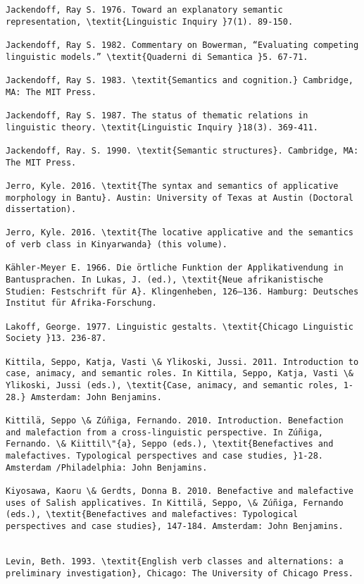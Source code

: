 \documentclass[output=paper]{langsci/langscibook}
\begin{document}
\begin{verbatim}
Jackendoff, Ray S. 1976. Toward an explanatory semantic representation, \textit{Linguistic Inquiry }7(1). 89-150.

Jackendoff, Ray S. 1982. Commentary on Bowerman, “Evaluating competing linguistic models.” \textit{Quaderni di Semantica }5. 67-71.

Jackendoff, Ray S. 1983. \textit{Semantics and cognition.} Cambridge, MA: The MIT Press.

Jackendoff, Ray S. 1987. The status of thematic relations in linguistic theory. \textit{Linguistic Inquiry }18(3). 369-411.

Jackendoff, Ray. S. 1990. \textit{Semantic structures}. Cambridge, MA: The MIT Press.

Jerro, Kyle. 2016. \textit{The syntax and semantics of applicative morphology in Bantu}. Austin: University of Texas at Austin (Doctoral dissertation). 

Jerro, Kyle. 2016. \textit{The locative applicative and the semantics of verb class in Kinyarwanda} (this volume).

Kähler-Meyer E. 1966. Die örtliche Funktion der Applikativendung in Bantusprachen. In Lukas, J. (ed.), \textit{Neue afrikanistische Studien: Festschrift für A}. Klingenheben, 126–136. Hamburg: Deutsches Institut für Afrika-Forschung.

Lakoff, George. 1977. Linguistic gestalts. \textit{Chicago Linguistic Society }13. 236-87.

Kittila, Seppo, Katja, Vasti \& Ylikoski, Jussi. 2011. Introduction to case, animacy, and semantic roles. In Kittila, Seppo, Katja, Vasti \& Ylikoski, Jussi (eds.), \textit{Case, animacy, and semantic roles, 1-28.} Amsterdam: John Benjamins.

Kittilä, Seppo \& Zúñiga, Fernando. 2010. Introduction. Benefaction and malefaction from a cross-linguistic perspective. In Zúñiga, Fernando. \& Kiittil\"{a}, Seppo (eds.), \textit{Benefactives and malefactives. Typological perspectives and case studies, }1-28. Amsterdam /Philadelphia: John Benjamins.

Kiyosawa, Kaoru \& Gerdts, Donna B. 2010. Benefactive and malefactive uses of Salish applicatives. In Kittilä, Seppo, \& Zúñiga, Fernando (eds.), \textit{Benefactives and malefactives: Typological perspectives and case studies}, 147-184. Amsterdam: John Benjamins.


Levin, Beth. 1993. \textit{English verb classes and alternations: a preliminary investigation}, Chicago: The University of Chicago Press. 




\end{verbatim}
\end{document}
